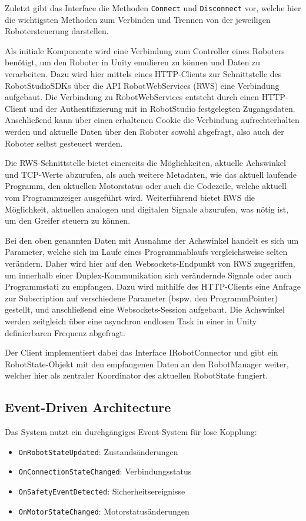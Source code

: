 Zuletzt gibt das Interface die Methoden \texttt{Connect} und
\texttt{Disconnect}
vor, welche hier die wichtigsten Methoden zum Verbinden und
Trennen von der jeweiligen Robotersteuerung darstellen.

Als initiale Komponente wird eine Verbindung zum
Controller eines Roboters benötigt, um den Roboter in Unity emulieren zu können
und Daten zu verarbeiten. Dazu wird hier mittels eines HTTP-Clients zur
Schnittstelle des RobotStudioSDKs über die API RobotWebServices (RWS) eine
Verbindung aufgebaut. Die Verbindung zu RobotWebServices entsteht durch einen
HTTP-Client und der Authentifizierung mit in RobotStudio festgelegten
Zugangsdaten. Anschließend kann über einen erhaltenen Cookie die Verbindung
aufrechterhalten werden und aktuelle Daten über den Roboter sowohl abgefragt,
also auch der Roboter selbst gesteuert werden.

Die RWS-Schnittstelle bietet einerseits die Möglichkeiten,
aktuelle Achswinkel und TCP-Werte abzurufen, als auch
weitere Metadaten, wie das aktuell laufende Programm, den aktuellen Motorstatus
oder auch die Codezeile, welche aktuell vom Programmzeiger ausgeführt wird.
Weiterführend bietet RWS die Möglichkeit, aktuellen analogen und digitalen
Signale abzurufen, was nötig ist, um den Greifer steuern zu können.

Bei den oben genannten Daten mit Ausnahme der Achswinkel handelt es sich um
Parameter, welche sich im Laufe eines Programmablaufs vergleichsweise selten
verändern. Daher wird hier auf den Websockets-Endpunkt von RWS zugegriffen, um
innerhalb einer Duplex-Kommunikation sich verändernde Signale oder auch
Programmstati zu empfangen. Dazu wird mithilfe des HTTP-Clients eine Anfrage zur
Subscription auf verschiedene Parameter (bspw. den ProgrammPointer) gestellt,
und anschließend eine Websockets-Session aufgebaut. Die Achswinkel werden
zeitgleich über eine asynchron endlosen Task in einer in Unity definierbaren
Frequenz abgefragt.

Der Client implementiert dabei das Interface IRobotConnector und gibt ein
RobotState-Objekt mit den empfangenen Daten an den RobotManager
weiter, welcher hier
als zentraler Koordinator des aktuellen RobotState fungiert.

\subsection{Event-Driven Architecture}
Das System nutzt ein durchgängiges Event-System für lose Kopplung:
\begin{itemize}
  \item \texttt{OnRobotStateUpdated}: Zustandsänderungen
  \item \texttt{OnConnectionStateChanged}: Verbindungsstatus
  \item \texttt{OnSafetyEventDetected}: Sicherheitsereignisse
  \item \texttt{OnMotorStateChanged}: Motorstatusänderungen
\end{itemize}

